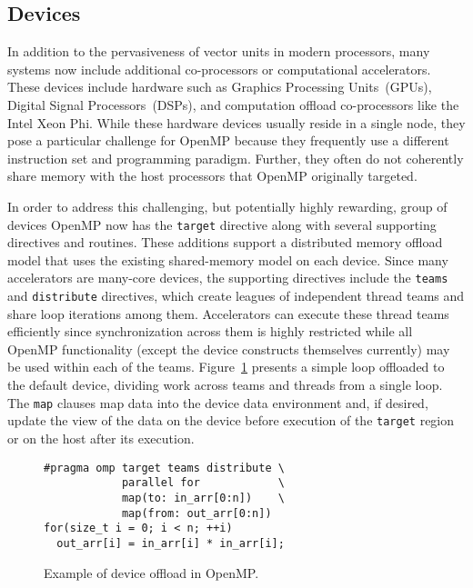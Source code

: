 \subsection{Devices}
\label{sub:devices}

In addition to the pervasiveness of vector units in modern processors, many
systems now include additional co-processors or computational accelerators.  
These devices include hardware such as Graphics Processing Units~(GPUs), 
Digital Signal Processors~(DSPs), and computation offload co-processors 
like the Intel Xeon Phi. While these hardware devices usually reside in 
a single node, they pose a particular challenge for OpenMP because they 
frequently use a different instruction set and programming paradigm. Further,
they often do not coherently share memory with the host processors that
OpenMP originally targeted.

In order to address this challenging, but potentially highly rewarding, 
group of devices OpenMP now has the \texttt{target} directive along with 
several supporting directives and routines. These additions support a 
distributed memory offload model that uses the existing shared-memory 
model on each device. Since many accelerators are many-core devices, the
supporting directives include the \texttt{teams} and \texttt{distribute} 
directives, which create leagues of independent thread teams and share 
loop iterations among them. Accelerators can execute these thread teams 
efficiently since synchronization across them is highly restricted while
all OpenMP functionality (except the device constructs themselves currently)
may be used within each of the teams. Figure~\ref{fig:target-loop} presents 
a simple loop offloaded to the default device, dividing work across teams 
and threads from a single loop. The \texttt{map} clauses map data into the 
device data environment and, if desired, update the view of the data on the 
device before execution of the \texttt{target} region or on the host after 
its execution.

\begin{figure}
\begin{verbatim}
#pragma omp target teams distribute \
            parallel for            \
            map(to: in_arr[0:n])    \
            map(from: out_arr[0:n])
for(size_t i = 0; i < n; ++i)
  out_arr[i] = in_arr[i] * in_arr[i];
\end{verbatim}
\caption{Example of device offload in OpenMP.\label{fig:target-loop}}
\end{figure}

